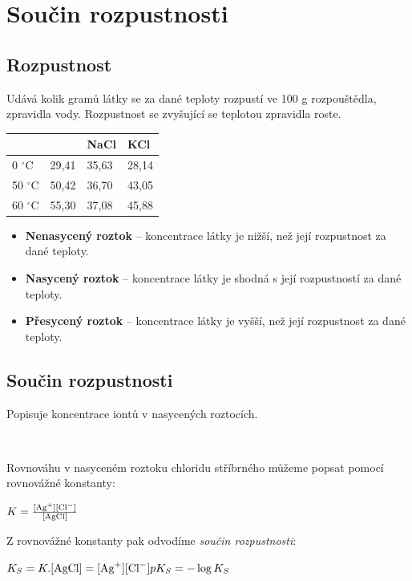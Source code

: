 \section{Součin rozpustnosti}

\subsection{Rozpustnost}
Udává kolik gramů látky se za dané teploty rozpustí ve 100 g rozpouštědla, zpravidla vody. Rozpustnost se zvyšující se teplotou zpravidla roste.

\begin{tabular}{|l|l|l|l|}
	\hline
	& \ce{NH4Cl} & NaCl & KCl \\\hline
	0 $^\circ$C & 29,41 & 35,63 & 28,14 \\\hline
	50 $^\circ$C & 50,42 & 36,70 & 43,05 \\\hline
	60 $^\circ$C & 55,30 & 37,08 & 45,88 \\\hline
\end{tabular}

\begin{itemize}
	\item \textbf{Nenasycený roztok} -- koncentrace látky je nižší, než její rozpustnost za dané teploty.
	\item \textbf{Nasycený roztok} -- koncentrace látky je shodná s její rozpustností za dané teploty.
	\item \textbf{Přesycený roztok} -- koncentrace látky je vyšší, než její rozpustnost za dané teploty.
\end{itemize}

\newpage

\subsection{Součin rozpustnosti}
Popisuje koncentrace iontů v nasycených roztocích.

\\

Rovnováhu v nasyceném roztoku chloridu stříbrného můžeme popsat pomocí rovnovážné konstanty:

$K = \frac{[\ce{Ag+}][\ce{Cl-}]}{[\textrm{AgCl}]}$

Z rovnovážné konstanty pak odvodíme \textit{součin rozpustnosti}:

$K_S = K.[\textrm{AgCl}] = [\ce{Ag+}][\ce{Cl-}]\\
pK_S = -\log K_S$

